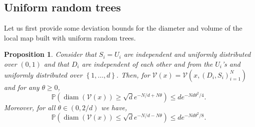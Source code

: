 \documentclass[paper=a4, fontsize=11pt]{scrartcl}
\newcommand{\diam}{\operatorname{diam}}
\newcommand{\PP}{\mathbb{P}}
\newtheorem{proposition}[theorem]{Proposition}
\begin{document}







\subsection{Uniform random trees}\label{subsec_URT}

Let us first provide some deviation bounds for the diameter and volume of the local map built with uniform random trees. 

\begin{proposition}\label{prop:diamURT2}
Consider  that $S_i=U_i$ are independent and uniformly distributed over $(0,1)$ and that $D_i$ are independent of each other and from the $U_i$'s and uniformly distributed over $\left\{ 1,\ldots,d\right\}$. Then, for $\mathcal V (x)= \mathcal V(x, (D_i,S_i)_{i=1}^N)$ and for any $\theta \geq 0$,
\begin{equation*}\label{eq_dev_diam_URT}
    \PP(\diam (\mathcal{V}(x))\geq \sqrt{d}e^{-N/d+N\theta}) \leq de^{-Nd\theta^2/4}.
\end{equation*} 
Moreover, for all $\theta \in (0,2/d)$ we have,
\begin{equation*}
    \PP(\diam (\mathcal{V}(x))\leq \sqrt{d}e^{-N/d - N\theta}) \leq de^{-Nd\theta^2/8}.
\end{equation*} 
\end{proposition}
\end{document}
